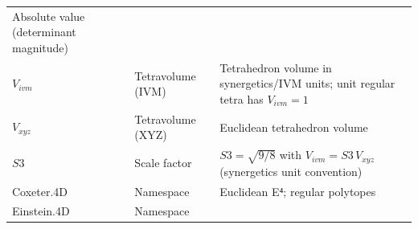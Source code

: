 \documentclass[
  10pt,
]{article}
\begin{document}
\begin{longtable}[]{@{}lll@{}}
\begin{minipage}[t]{0.30\columnwidth}
Absolute value (determinant magnitude)\strut
\end{minipage}\tabularnewline
\begin{minipage}[t]{0.30\columnwidth}\raggedright
\(V_{ivm}\)\strut
\end{minipage} & \begin{minipage}[t]{0.30\columnwidth}\raggedright
Tetravolume (IVM)\strut
\end{minipage} & \begin{minipage}[t]{0.30\columnwidth}\raggedright
Tetrahedron volume in synergetics/IVM units; unit regular tetra has
\(V_{ivm}=1\)\strut
\end{minipage}\tabularnewline
\begin{minipage}[t]{0.30\columnwidth}\raggedright
\(V_{xyz}\)\strut
\end{minipage} & \begin{minipage}[t]{0.30\columnwidth}\raggedright
Tetravolume (XYZ)\strut
\end{minipage} & \begin{minipage}[t]{0.30\columnwidth}\raggedright
Euclidean tetrahedron volume\strut
\end{minipage}\tabularnewline
\begin{minipage}[t]{0.30\columnwidth}\raggedright
\(S3\)\strut
\end{minipage} & \begin{minipage}[t]{0.30\columnwidth}\raggedright
Scale factor\strut
\end{minipage} & \begin{minipage}[t]{0.30\columnwidth}\raggedright
\(S3=\sqrt{9/8}\) with \(V_{ivm} = S3\,V_{xyz}\) (synergetics unit
convention)\strut
\end{minipage}\tabularnewline
\begin{minipage}[t]{0.30\columnwidth}\raggedright
Coxeter.4D\strut
\end{minipage} & \begin{minipage}[t]{0.30\columnwidth}\raggedright
Namespace\strut
\end{minipage} & \begin{minipage}[t]{0.30\columnwidth}\raggedright
Euclidean E⁴; regular polytopes\strut
\end{minipage}\tabularnewline
\begin{minipage}[t]{0.30\columnwidth}\raggedright
Einstein.4D\strut
\end{minipage} & \begin{minipage}[t]{0.30\columnwidth}\raggedright
Namespace\strut
\end{minipage} & \begin{minipage}[t]{0.30\columnwidth}\raggedright

\end{minipage}
\end{longtable}
\end{document}
